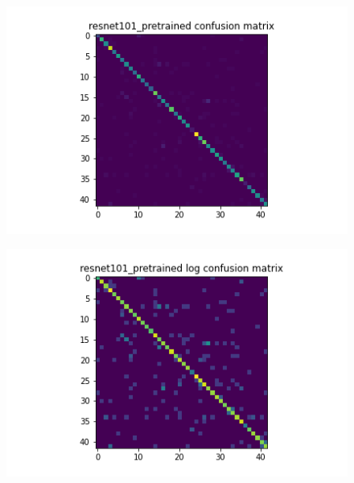 \begin{figure}[H]
  \begin{minipage}[b]{.5\linewidth}
    \centering
    {\includegraphics[width=1.2\textwidth]{figs/conf_matrix/resnet101_pretrained_conf.png}}
  \end{minipage}
  \hfill
  \begin{minipage}[b]{.5\linewidth}
    \centering

    {\includegraphics[width=1.2\textwidth]{figs/conf_matrix/resnet101_pretrained_log_conf.png}}
  \end{minipage}
  \vfill
  \begin{minipage}[b]{.5\linewidth}
    \centering


\end{minipage}
\end{figure}
